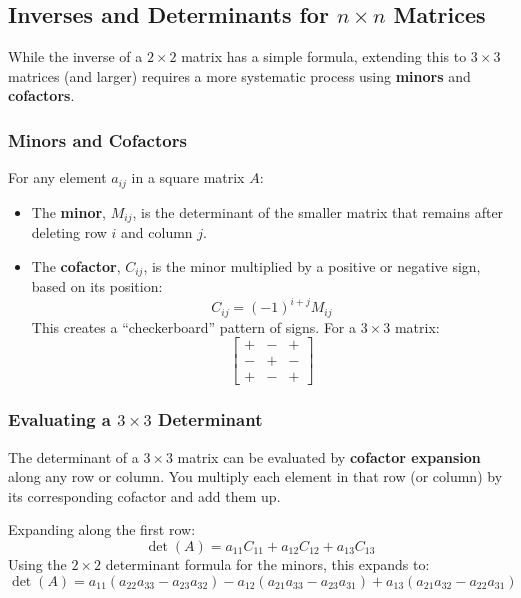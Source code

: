 
\subsection{Inverses and Determinants for $n \times n$ Matrices}

While the inverse of a $2 \times 2$ matrix has a simple formula, extending this to $3 \times 3$ matrices (and larger) requires a more systematic process using \textbf{minors} and \textbf{cofactors}.

\subsubsection*{Minors and Cofactors}

For any element $a_{ij}$ in a square matrix $A$:
\begin{itemize}[leftmargin=*]
  \item The \textbf{minor}, $M_{ij}$, is the determinant of the smaller matrix that remains after deleting row $i$ and column $j$.
  \item The \textbf{cofactor}, $C_{ij}$, is the minor multiplied by a positive or negative sign, based on its position:
  \[
  C_{ij} = (-1)^{i+j} M_{ij}
  \]
  This creates a ``checkerboard'' pattern of signs. For a $3 \times 3$ matrix:
  \[
  \begin{bmatrix} + & - & + \\ - & + & - \\ + & - & + \end{bmatrix}
  \]
\end{itemize}

\subsubsection*{Evaluating a $3 \times 3$ Determinant}

The determinant of a $3 \times 3$ matrix can be evaluated by \textbf{cofactor expansion} along any row or column. You multiply each element in that row (or column) by its corresponding cofactor and add them up.

Expanding along the first row:
\[
\det(A) = a_{11}C_{11} + a_{12}C_{12} + a_{13}C_{13}
\]
Using the $2 \times 2$ determinant formula for the minors, this expands to:
\[
\det(A) = a_{11}(a_{22}a_{33} - a_{23}a_{32}) - a_{12}(a_{21}a_{33} - a_{23}a_{31}) + a_{13}(a_{21}a_{32} - a_{22}a_{31})
\]

